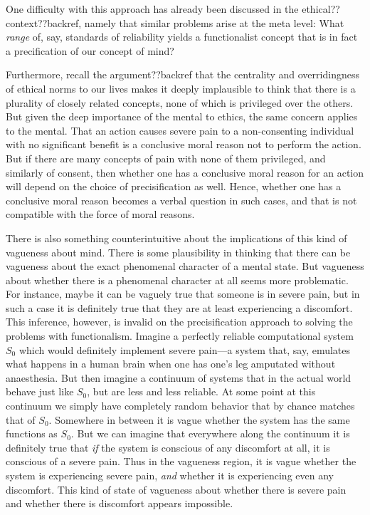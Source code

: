 One difficulty with this approach has already been discussed in the ethical?? context??backref, namely that similar problems
arise at the meta level: What \textit{range} of, say, standards of reliability yields a functionalist concept that is in fact a 
precification of our concept of mind? 

Furthermore, recall the argument??backref that the centrality and overridingness of ethical norms to our lives makes it 
deeply implausible to think that there is a plurality of closely related concepts, none of which is privileged over the others.
But given the deep importance of the mental to ethics, the same concern applies to the mental. That an action causes severe
pain to a non-consenting individual with no significant benefit is a conclusive moral reason not to perform the action. 
But if there are many concepts of pain with none of them privileged, and similarly of consent, then whether one has a
conclusive moral reason for an action will depend on the choice of precisification as well. Hence, whether one has a 
conclusive moral reason becomes a verbal question in such cases, and that is not compatible with the force of moral
reasons.

There is also something counterintuitive about the implications of this kind of vagueness about mind. There is some 
plausibility in thinking that there can be vagueness about the exact phenomenal character of a mental 
state. But vagueness about whether there is a phenomenal character at all seems more problematic. For instance,
maybe it can be vaguely true that someone is in severe pain, but in such a case it is definitely true that they are 
at least experiencing a discomfort. This inference, however, is invalid on the precisification approach to solving 
the problems with functionalism. Imagine a perfectly reliable computational system $S_0$ which would definitely implement severe pain---a 
system that, say, emulates what happens in a human brain when one has one's leg amputated without anaesthesia. 
But then imagine a continuum of systems that in the actual world behave just like $S_0$, but are less and less 
reliable. At some point at this continuum we simply have completely random behavior that by chance matches that 
of $S_0$. Somewhere in between it is vague whether the system has the same functions as $S_0$. But we can imagine that 
everywhere along the continuum it is definitely true that \textit{if} the system is conscious of any discomfort at all, it is 
conscious of a severe pain. Thus in the vagueness region, it is vague whether the system is experiencing
severe pain, \textit{and} whether it is experiencing even any discomfort. This kind of state of vagueness about whether
there is severe pain and whether there is discomfort appears impossible.


